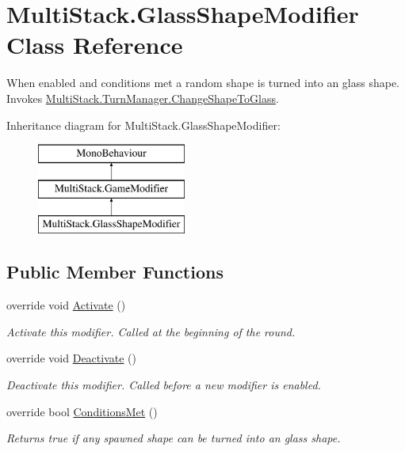\hypertarget{class_multi_stack_1_1_glass_shape_modifier}{}\section{Multi\+Stack.\+Glass\+Shape\+Modifier Class Reference}
\label{class_multi_stack_1_1_glass_shape_modifier}


When enabled and conditions met a random shape is turned into an glass shape. Invokes \hyperlink{class_multi_stack_1_1_turn_manager_a5ecde21a2b9c4d25fa781e717a946700}{Multi\+Stack.\+Turn\+Manager.\+Change\+Shape\+To\+Glass}.  


Inheritance diagram for Multi\+Stack.\+Glass\+Shape\+Modifier\+:\begin{figure}[H]
\begin{center}
\leavevmode
\includegraphics[height=3.000000cm]{class_multi_stack_1_1_glass_shape_modifier}
\end{center}
\end{figure}
\subsection*{Public Member Functions}
\begin{DoxyCompactItemize}
\item 
override void \hyperlink{class_multi_stack_1_1_glass_shape_modifier_aeb771b0599250515a886e0175aee746e}{Activate} ()
\begin{DoxyCompactList}\small\item\em Activate this modifier. Called at the beginning of the round. \end{DoxyCompactList}\item 
override void \hyperlink{class_multi_stack_1_1_glass_shape_modifier_a44026d971a40d8e5ce02f2611be19b0f}{Deactivate} ()
\begin{DoxyCompactList}\small\item\em Deactivate this modifier. Called before a new modifier is enabled. \end{DoxyCompactList}\item 
override bool \hyperlink{class_multi_stack_1_1_glass_shape_modifier_a75991df9c063e2fc4fd1183001df7206}{Conditions\+Met} ()
\begin{DoxyCompactList}\small\item\em Returns true if any spawned shape can be turned into an glass shape. \end{DoxyCompactList}\end{DoxyCompactItemize}
